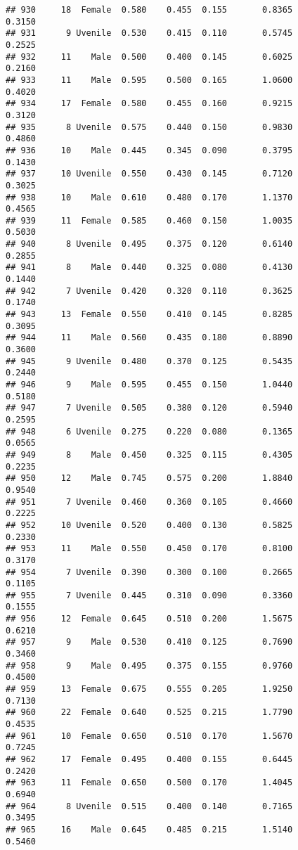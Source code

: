 \documentclass[
]{article}
\begin{document}
\begin{verbatim}
## 930     18  Female  0.580    0.455  0.155       0.8365         0.3150
## 931      9 Uvenile  0.530    0.415  0.110       0.5745         0.2525
## 932     11    Male  0.500    0.400  0.145       0.6025         0.2160
## 933     11    Male  0.595    0.500  0.165       1.0600         0.4020
## 934     17  Female  0.580    0.455  0.160       0.9215         0.3120
## 935      8 Uvenile  0.575    0.440  0.150       0.9830         0.4860
## 936     10    Male  0.445    0.345  0.090       0.3795         0.1430
## 937     10 Uvenile  0.550    0.430  0.145       0.7120         0.3025
## 938     10    Male  0.610    0.480  0.170       1.1370         0.4565
## 939     11  Female  0.585    0.460  0.150       1.0035         0.5030
## 940      8 Uvenile  0.495    0.375  0.120       0.6140         0.2855
## 941      8    Male  0.440    0.325  0.080       0.4130         0.1440
## 942      7 Uvenile  0.420    0.320  0.110       0.3625         0.1740
## 943     13  Female  0.550    0.410  0.145       0.8285         0.3095
## 944     11    Male  0.560    0.435  0.180       0.8890         0.3600
## 945      9 Uvenile  0.480    0.370  0.125       0.5435         0.2440
## 946      9    Male  0.595    0.455  0.150       1.0440         0.5180
## 947      7 Uvenile  0.505    0.380  0.120       0.5940         0.2595
## 948      6 Uvenile  0.275    0.220  0.080       0.1365         0.0565
## 949      8    Male  0.450    0.325  0.115       0.4305         0.2235
## 950     12    Male  0.745    0.575  0.200       1.8840         0.9540
## 951      7 Uvenile  0.460    0.360  0.105       0.4660         0.2225
## 952     10 Uvenile  0.520    0.400  0.130       0.5825         0.2330
## 953     11    Male  0.550    0.450  0.170       0.8100         0.3170
## 954      7 Uvenile  0.390    0.300  0.100       0.2665         0.1105
## 955      7 Uvenile  0.445    0.310  0.090       0.3360         0.1555
## 956     12  Female  0.645    0.510  0.200       1.5675         0.6210
## 957      9    Male  0.530    0.410  0.125       0.7690         0.3460
## 958      9    Male  0.495    0.375  0.155       0.9760         0.4500
## 959     13  Female  0.675    0.555  0.205       1.9250         0.7130
## 960     22  Female  0.640    0.525  0.215       1.7790         0.4535
## 961     10  Female  0.650    0.510  0.170       1.5670         0.7245
## 962     17  Female  0.495    0.400  0.155       0.6445         0.2420
## 963     11  Female  0.650    0.500  0.170       1.4045         0.6940
## 964      8 Uvenile  0.515    0.400  0.140       0.7165         0.3495
## 965     16    Male  0.645    0.485  0.215       1.5140         0.5460

\end{verbatim}
\end{document}
